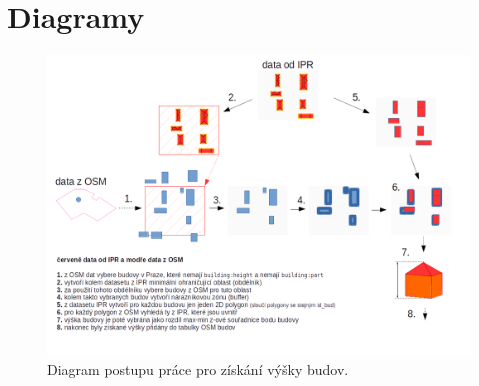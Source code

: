 \chapter{Diagramy}
\label{digramy}

\begin{figure}[hbt]
  \centering
  \includegraphics[scale=0.6,angle=90]{pictures/diagram_building_height.png}
  \caption{Diagram postupu práce pro získání výšky budov.}
  \label{fig:diagram_building}
\end{figure}






